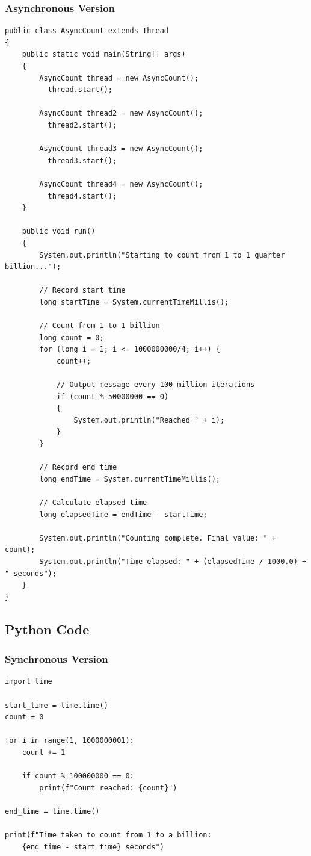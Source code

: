 \documentclass[12pt,a4paper]{article}
\begin{document}
\subsubsection{Asynchronous Version}
\begin{verbatim}
public class AsyncCount extends Thread
{
    public static void main(String[] args) 
    {
        AsyncCount thread = new AsyncCount();
          thread.start();

        AsyncCount thread2 = new AsyncCount();
          thread2.start();

        AsyncCount thread3 = new AsyncCount();
          thread3.start();

        AsyncCount thread4 = new AsyncCount();
          thread4.start();
    }

    public void run() 
    {
        System.out.println("Starting to count from 1 to 1 quarter billion...");
        
        // Record start time
        long startTime = System.currentTimeMillis();
        
        // Count from 1 to 1 billion
        long count = 0;
        for (long i = 1; i <= 1000000000/4; i++) {
            count++;
            
            // Output message every 100 million iterations
            if (count % 50000000 == 0) 
            {
                System.out.println("Reached " + i);
            }
        }
        
        // Record end time
        long endTime = System.currentTimeMillis();
        
        // Calculate elapsed time
        long elapsedTime = endTime - startTime;
        
        System.out.println("Counting complete. Final value: " + count);
        System.out.println("Time elapsed: " + (elapsedTime / 1000.0) + " seconds");
    }
}
\end{verbatim}

\subsection{Python Code}

\subsubsection{Synchronous Version}
\begin{verbatim}
import time

start_time = time.time()
count = 0

for i in range(1, 1000000001):
    count += 1
    
    if count % 100000000 == 0:
        print(f"Count reached: {count}")

end_time = time.time()

print(f"Time taken to count from 1 to a billion: 
    {end_time - start_time} seconds")
\end{verbatim}
\end{document}
